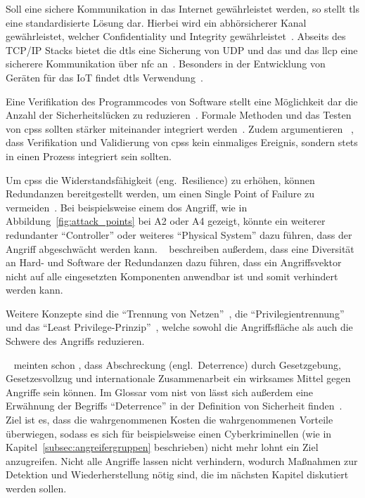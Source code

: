 \documentclass[final,bibliography=totocnumbered]{include/sikseminar}
\newcommand{\cps}{\glspl{cps}\xspace}
\begin{document}

    Soll eine sichere Kommunikation in das Internet gewährleistet werden, so stellt \gls{tls} eine standardisierte Lösung dar.
    Hierbei wird ein abhörsicherer Kanal gewährleistet, welcher Confidentiality und Integrity gewährleistet~\cite{SPB+16}.
   Abseits des TCP/IP Stacks bietet die \acrlong{dtls} eine Sicherung von UDP und das und das \acrlong{llcp} eine sicherere Kommunikation über \acrlong{nfc} an~\cite{SPB+16}.
    Besonders in der Entwicklung von Geräten für das IoT findet \gls{dtls} Verwendung~\cite{YWY+17,FPA+18}.


    Eine Verifikation des Programmcodes von Software stellt eine Möglichkeit dar die Anzahl der Sicherheitslücken zu reduzieren~\cite{CAS08}.
    Formale Methoden und das Testen von \cps sollten stärker miteinander integriert werden~\cite{RLS+10}.
    Zudem argumentieren \citeauthor{SGL+08}~\cite{SGL+08}, dass Verifikation und Validierung von \cps kein einmaliges Ereignis, sondern stets in einen Prozess integriert sein sollten.


    Um \cps die Widerstandsfähigkeit (eng.\ Resilience) zu erhöhen, können Redundanzen bereitgestellt werden, um einen Single Point of Failure zu vermeiden~\cite{CAS+09}.
    Bei beispielsweise einem \gls{dos} Angriff, wie in Abbildung~\ref{fig:attack_points} bei A2 oder A4 gezeigt, könnte ein weiterer redundanter \enquote{Controller} oder weiteres \enquote{Physical System} dazu führen, dass der Angriff abgeschwächt werden kann.
    \citeauthor{CAS+09}~\cite{CAS+09} beschreiben außerdem, dass eine Diversität an Hard- und Software der Redundanzen dazu führen, dass ein Angriffsvektor nicht auf alle eingesetzten Komponenten anwendbar ist und somit verhindert werden kann.


    Weitere Konzepte sind die \enquote{Trennung von Netzen}~\cite{GK16}, die \enquote{Privilegientrennung} und das \enquote{Least Privilege-Prinzip}~\cite{CAS+09}, welche sowohl die Angriffsfläche als auch die Schwere des Angriffs reduzieren.

    \citeauthor{CAS+09}~\cite{CAS+09} meinten schon \citeyear{CAS+09}, dass Abschreckung (engl.\ Deterrence) durch Gesetzgebung, Gesetzesvollzug und internationale Zusammenarbeit ein wirksames Mittel gegen Angriffe sein können.
    Im Glossar vom \gls{nist} von \citeyear{Kissel13} lässt sich außerdem eine Erwähnung der Begriffs \enquote{Deterrence} in der Definition von Sicherheit finden~\cite{Kissel13}.
    Ziel ist es, dass die wahrgenommenen Kosten die wahrgenommenen Vorteile überwiegen, sodass es sich für beispielsweise einen Cyberkriminellen (wie in Kapitel~\ref{subsec:angreifergruppen} beschrieben) nicht mehr lohnt ein Ziel anzugreifen.
    Nicht alle Angriffe lassen nicht verhindern, wodurch Maßnahmen zur Detektion und Wiederherstellung nötig sind, die im nächsten Kapitel diskutiert werden sollen.
\end{document}

